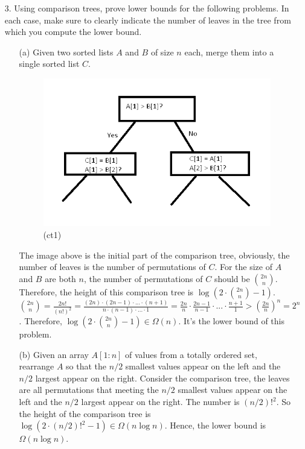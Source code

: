 \documentclass{article}       %
\begin{document}
\begin{enumerate}
	\item[3.] Using comparison trees, prove lower bounds for the following problems. In each case, make sure to clearly indicate the number of leaves in the tree from which you compute the lower bound.
	\begin{enumerate}
		\item[(a)] Given two sorted lists $A$ and $B$ of size $n$ each, merge them into a single sorted list $C$.\newline\newline
		\begin{figure}[H]
			\centering
			\includegraphics[width=10cm]{ct1}
			\caption{(ct1)}
			\label{ct1}
		\end{figure}
		The image above is the initial part of the comparison tree, obviously, the number of leaves is the number of permutations of $C$. For the size of $A$ and $B$ are both $n$, the number of permutations of $C$ should be $2n \choose n$. Therefore, the height of this comparison tree is $\log (2\cdot {2n \choose n} -1)$.\newline
		${2n \choose n} = \frac{2n!}{(n!)^2} = \frac{(2n)\cdot (2n-1) \cdot ... \cdot (n+1)}{n\cdot (n-1) \cdot ... \cdot 1} = \frac{2n}{n} \cdot \frac{2n-1}{n-1} \cdot ... \cdot \frac{n+1}{1} > (\frac{2n}{n})^n = 2^n$.\newline
		Therefore, $\log (2\cdot {2n \choose n} -1) \in \Omega (n)$. It's the lower bound of this problem.\newline
		\item[(b)] Given an array $A[1:n]$ of values from a totally ordered set, rearrange $A$ so that the $n/2$ smallest values appear on the left and the $n/2$ largest appear on the right.\newline\newline
		Consider the comparison tree, the leaves are all permutations that meeting the $n/2$ smallest values appear on the left and the $n/2$ largest appear on the right. The number is $(n/2)!^2$. So the height of the comparison tree is $\log (2\cdot (n/2)!^2 - 1) \in \Omega(n\log n)$. Hence, the lower bound is $\Omega(n\log n)$.

\end{enumerate}
\end{enumerate}
\end{document}
